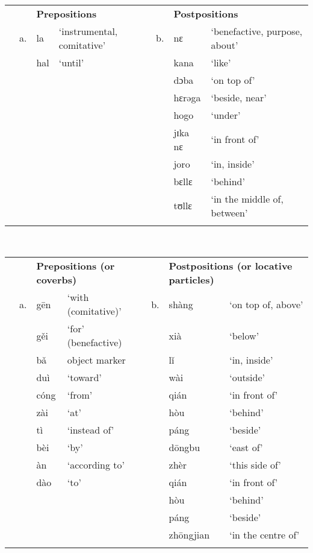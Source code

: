 \documentclass[output=paper]{langsci/langscibook}
\begin{document}
\begin{table}
\label{ex:dryer:}
\\

\begin{tabularx}{\textwidth}{XXXXXXX} &  & \multicolumn{2}{X}{\bfseries Prepositions} &  & \multicolumn{2}{X}{\bfseries Postpositions}\\
\lsptoprule
& a. & la & ‘instrumental, comitative’ & b. & nɛ & ‘benefactive, purpose, about’\\
&  & hal & ‘until’ &  & kana & ‘like’\\
&  &  &  &  & dɔba & ‘on top of’\\
&  &  &  &  & hɛrəga & ‘beside, near’\\
&  &  &  &  & hogo & ‘under’\\
&  &  &  &  & jɪka nɛ & ‘in front of’\\
&  &  &  &  & joro & ‘in, inside’\\
&  &  &  &  & bɛllɛ & ‘behind’\\
&  &  &  &  & tʊllɛ & ‘in the middle of, between’\\
\lspbottomrule
\end{tabularx}
\end{table}

\begin{table}
\label{ex:dryer:}
\\
\begin{tabularx}{\textwidth}{XXXXXXX} &  & \multicolumn{2}{X}{\bfseries Prepositions (or coverbs)} &  & \multicolumn{2}{X}{\bfseries Postpositions (or locative particles)}\\
\lsptoprule
& a. & gēn & ‘with (comitative)’ & b. & shàng & ‘on top of, above’\\
&  & gěi & ‘for’ (benefactive) &  & xià & ‘below’\\
&  & bǎ & object marker &  & lǐ & ‘in, inside’\\
&  & duì & ‘toward’ &  & wài & ‘outside’\\
&  & cóng & ‘from’ &  & qián & ‘in front of’\\
&  & zài & ‘at’ &  & hòu & ‘behind’\\
&  & tì & ‘instead of’ &  & páng & ‘beside’\\
&  & bèi & ‘by’ &  & dōngbu & ‘east of’\\
&  & àn & ‘according to’ &  & zhèr & ‘this side of’\\
&  & dào & ‘to’ &  & qián & ‘in front of’\\
&  &  &  &  & hòu & ‘behind’\\
&  &  &  &  & páng & ‘beside’\\
&  &  &  &  & zhōngjian & ‘in the centre of’\\
\lspbottomrule
\end{tabularx}
\end{table}
\end{document}
